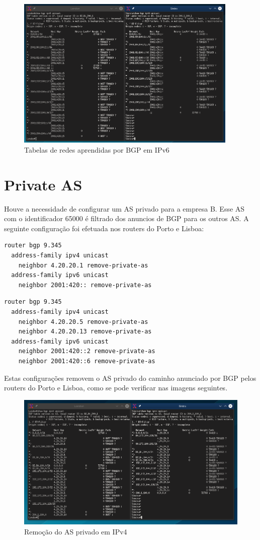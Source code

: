 \documentclass[11pt,a4paper]{report}
\begin{document}
\begin{figure}[H]
\centerline{\includegraphics[width=300pt]{private_as_removal_ipv6.png}}
\caption{Tabelas de redes aprendidas por BGP em IPv6}
\label{schema}
\end{figure}

\section{Private AS}
Houve a necessidade de configurar um AS privado para a empresa B. Esse AS com o identificador 65000 é filtrado dos anuncios de BGP para os outros AS. A seguinte configuração foi efetuada nos routers do Porto e Lisboa:

\begin{lstlisting}[caption=Remoção do AS privado - Router Porto]
router bgp 9.345
  address-family ipv4 unicast
    neighbor 4.20.20.1 remove-private-as
  address-family ipv6 unicast
  	neighbor 2001:420:: remove-private-as
\end{lstlisting}

\begin{lstlisting}[caption=Remoção do AS privado - Router Lisboa]
router bgp 9.345
  address-family ipv4 unicast
    neighbor 4.20.20.5 remove-private-as
    neighbor 4.20.20.13 remove-private-as
  address-family ipv6 unicast
  	neighbor 2001:420::2 remove-private-as
  	neighbor 2001:420::6 remove-private-as
\end{lstlisting}

Estas configurações removem o AS privado do caminho anunciado por BGP pelos routers do Porto e Lisboa, como se pode verificar nas imagens seguintes.

\begin{figure}[H]
\centerline{\includegraphics[width=340pt]{private_as_removal_ipv4.png}}
\caption{Remoção do AS privado em IPv4}
\label{schema}
\end{figure}
\end{document}
